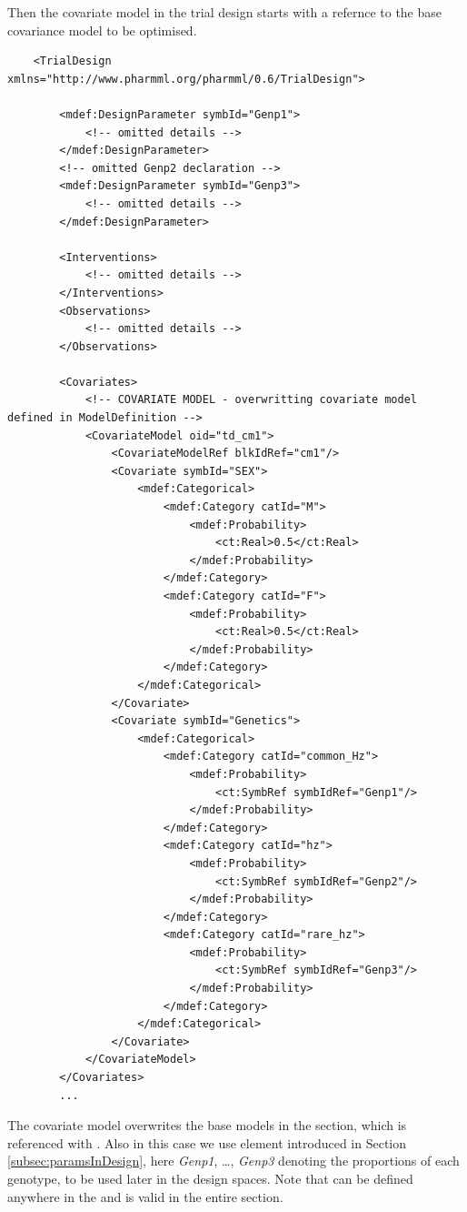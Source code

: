 Then the covariate model in the trial design starts with a refernce to the 
base covariance model to be optimised.
\lstset{language=XML}
\begin{lstlisting}
    <TrialDesign xmlns="http://www.pharmml.org/pharmml/0.6/TrialDesign">
        
        <mdef:DesignParameter symbId="Genp1">
            <!-- omitted details -->
        </mdef:DesignParameter>
        <!-- omitted Genp2 declaration -->
        <mdef:DesignParameter symbId="Genp3">
            <!-- omitted details -->
        </mdef:DesignParameter>
        
        <Interventions>
            <!-- omitted details -->
        </Interventions>            
        <Observations>
            <!-- omitted details -->
        </Observations>
        
        <Covariates>
            <!-- COVARIATE MODEL - overwritting covariate model defined in ModelDefinition -->
            <CovariateModel oid="td_cm1">
                <CovariateModelRef blkIdRef="cm1"/>
                <Covariate symbId="SEX">
                    <mdef:Categorical>
                        <mdef:Category catId="M">
                            <mdef:Probability>
                                <ct:Real>0.5</ct:Real>
                            </mdef:Probability>
                        </mdef:Category>
                        <mdef:Category catId="F">
                            <mdef:Probability>
                                <ct:Real>0.5</ct:Real>
                            </mdef:Probability>
                        </mdef:Category>
                    </mdef:Categorical>
                </Covariate>
                <Covariate symbId="Genetics">
                    <mdef:Categorical>
                        <mdef:Category catId="common_Hz">
                            <mdef:Probability>
                                <ct:SymbRef symbIdRef="Genp1"/>
                            </mdef:Probability>
                        </mdef:Category>
                        <mdef:Category catId="hz">
                            <mdef:Probability>
                                <ct:SymbRef symbIdRef="Genp2"/>
                            </mdef:Probability>
                        </mdef:Category>
                        <mdef:Category catId="rare_hz">
                            <mdef:Probability>
                                <ct:SymbRef symbIdRef="Genp3"/>
                            </mdef:Probability>
                        </mdef:Category>
                    </mdef:Categorical>
                </Covariate>
            </CovariateModel>            
        </Covariates>
        ...
\end{lstlisting}
The covariate model overwrites the base models in the 
section, which is referenced with .
Also in this case we use  element introduced in Section 
\ref{subsec:paramsInDesign}, here \emph{Genp1}, \dots, \emph{Genp3} denoting 
the proportions of each genotype, to be used later in the design spaces. Note that
 can be defined anywhere in the  and 
is valid in the entire section.


